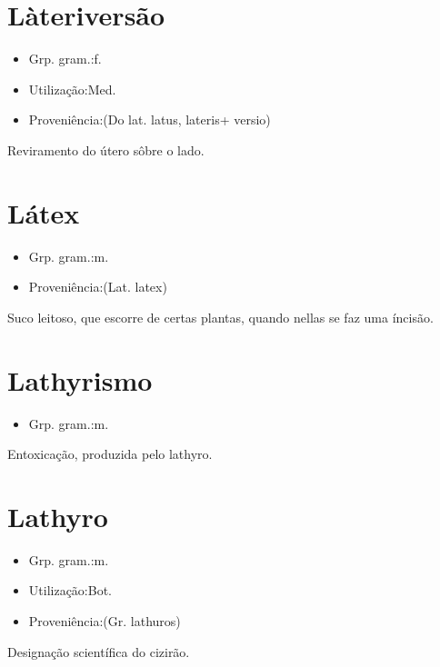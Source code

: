 \section{Làteriversão}
\begin{itemize}
\item {Grp. gram.:f.}
\end{itemize}
\begin{itemize}
\item {Utilização:Med.}
\end{itemize}
\begin{itemize}
\item {Proveniência:(Do lat. \textunderscore latus\textunderscore , \textunderscore lateris\textunderscore  + \textunderscore versio\textunderscore )}
\end{itemize}
Reviramento do útero sôbre o lado.
\section{Látex}
\begin{itemize}
\item {Grp. gram.:m.}
\end{itemize}
\begin{itemize}
\item {Proveniência:(Lat. \textunderscore latex\textunderscore )}
\end{itemize}
Suco leitoso, que escorre de certas plantas, quando nellas se faz uma íncisão.
\section{Lathyrismo}
\begin{itemize}
\item {Grp. gram.:m.}
\end{itemize}
Entoxicação, produzida pelo lathyro.
\section{Lathyro}
\begin{itemize}
\item {Grp. gram.:m.}
\end{itemize}
\begin{itemize}
\item {Utilização:Bot.}
\end{itemize}
\begin{itemize}
\item {Proveniência:(Gr. \textunderscore lathuros\textunderscore )}
\end{itemize}
Designação scientífica do cizirão.
